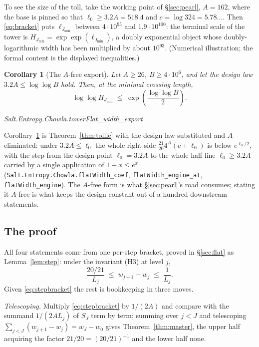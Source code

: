 \documentclass[11pt]{amsart}
\newcommand{\leanname}[1]{\par{\noindent\small\ttfamily\raggedright #1\par}}
\newcommand{\leaninline}[1]{{\small\texttt{#1}}}
\newtheorem{corollary}[theorem]{Corollary}
\theoremstyle{remark}
\begin{document}
To see the size of the toll, take the working point of \S\ref{sec:pearl},
$A = 162$, where the base is pinned so that $\ell_0 \ge 3.2A = 518.4$
and $c = \log 324 = 5.78\ldots$. Then \eqref{eq:bracket} puts
$\ell_{J_{\min}}$ between $4\cdot10^{95}$ and $1.9\cdot10^{100}$: the
terminal scale of the tower is $H_{J_{\min}} = \exp\exp(\ell_{J_{\min}})$,
a doubly exponential object whose doubly-logarithmic width has been
multiplied by about $10^{93}$. (Numerical illustration; the formal content
is the displayed inequalities.)

\begin{corollary}[The $A$-free export]\label{cor:export}
Let $A \ge 26$, $B \ge 4\cdot10^{6}$, and let the design law
$3.2A \le \log\log B$ hold. Then, at the minimal crossing length,
\[
\log\log H_{J_{\min}} \;\le\; \exp\!\left(\frac{\log\log B}{2}\right).
\]
\leanname{Salt.Entropy.Chowla.towerFlat\_width\_export}
\end{corollary}

Corollary~\ref{cor:export} is Theorem~\ref{thm:tollle} with the design law
substituted and $A$ eliminated: under $3.2A \le \ell_0$ the whole right
side $\frac{21}{20}4^{A}(c+\ell_0)$ is below $e^{\ell_0/2}$, with the
step from the design point $\ell_0 = 3.2A$ to the whole half-line
$\ell_0 \ge 3.2A$ carried by a single application of $1 + x \le e^{x}$
(\leaninline{Salt.Entropy.Chowla.flatWidth\_coef},
\leaninline{flatWidth\_engine\_at}, \leaninline{flatWidth\_engine}). The
$A$-free form is what \S\ref{sec:pearl}'s road consumes; stating it
$A$-free is what keeps the design constant out of a hundred downstream
statements.

\subsection{The proof}
All four statements come from one per-step bracket, proved in
\S\ref{sec:flat} as Lemma~\ref{lem:step}: under the invariant (H3) at
level $j$,
\begin{equation}\label{eq:stepbracket}
\frac{20/21}{L_j} \;\le\; w_{j+1} - w_j \;\le\; \frac{1}{L_j}.
\end{equation}
Given \eqref{eq:stepbracket} the rest is bookkeeping in three moves.

\emph{Telescoping.} Multiply \eqref{eq:stepbracket} by $1/(2A)$ and
compare with the summand $1/(2AL_j)$ of $S_J$ term by term; summing over
$j < J$ and telescoping $\sum_{j<J}(w_{j+1}-w_j) = w_J - w_0$ gives
Theorem~\ref{thm:master}, the upper half acquiring the factor $21/20 =
(20/21)^{-1}$ and the lower half none.
\end{document}
